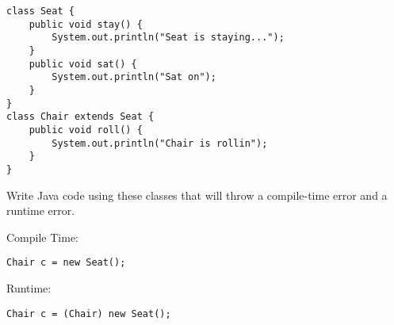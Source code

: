 \begin{blocksection}
\question
\begin{lstlisting}
class Seat {
    public void stay() {
        System.out.println("Seat is staying...");
    }
    public void sat() {
        System.out.println("Sat on");
    }
}
class Chair extends Seat {
    public void roll() {
        System.out.println("Chair is rollin");
    }
}
\end{lstlisting}

Write Java code using these classes that will throw a compile-time error and a runtime error.

\begin{Solution}
Compile Time:
\begin{verbatim}
Chair c = new Seat();
\end{verbatim}

Runtime:
\begin{verbatim}
Chair c = (Chair) new Seat();
\end{verbatim}

\end{Solution}

\end{blocksection}
